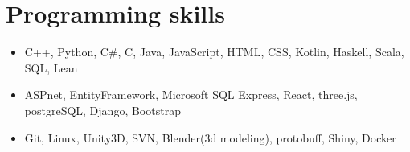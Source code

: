 \documentclass[11pt,a4paper,sans]{moderncv}        %
\begin{document}
		
		
		\section{Programming skills}
		\begin{itemize}
			\item C++, Python, C\#, C, Java, JavaScript, HTML, CSS, Kotlin, Haskell, Scala, SQL, Lean
			\item ASPnet, EntityFramework, Microsoft SQL Express, React, three.js, postgreSQL, Django, Bootstrap
			\item Git, Linux, Unity3D, SVN, Blender(3d modeling), protobuff, Shiny, Docker
			
		\end{itemize}
		\newpage
\end{document}
